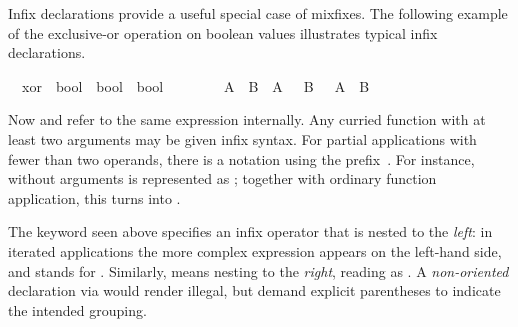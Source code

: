 \begin{isabellebody}
\begin{isamarkuptext}
  Infix declarations provide a useful special
  case of mixfixes.  The following example of the exclusive-or
  operation on boolean values illustrates typical infix declarations.%
\end{isamarkuptext}%
\isamarkuptrue%
\isamarkupfalse%
\isanewline
\ \ xor\ {\isacharcolon}{\isacharcolon}\ {\isachardoublequoteopen}bool\ {\isasymRightarrow}\ bool\ {\isasymRightarrow}\ bool{\isachardoublequoteclose}\ \ \ \ {\isacharparenleft}\ {\isachardoublequoteopen}{\isacharbrackleft}{\isacharplus}{\isacharbrackright}{\isachardoublequoteclose}\ {}{}{\isacharparenright}\isanewline
\ \ {\isachardoublequoteopen}A\ {\isacharbrackleft}{\isacharplus}{\isacharbrackright}\ B\ {\isasymequiv}\ {\isacharparenleft}A\ {\isasymand}\ {\isasymnot}\ B{\isacharparenright}\ {\isasymor}\ {\isacharparenleft}{\isasymnot}\ A\ {\isasymand}\ B{\isacharparenright}{\isachardoublequoteclose}%
\begin{isamarkuptext}%
\noindent Now  and  refer to the
  same expression internally.  Any curried function with at least two
  arguments may be given infix syntax.  For partial applications with
  fewer than two operands, there is a notation using the prefix~.  For instance,  without arguments is represented as
  ; together with ordinary function application, this
  turns  into .

  \medskip The keyword  seen above specifies an
  infix operator that is nested to the \emph{left}: in iterated
  applications the more complex expression appears on the left-hand
  side, and  stands for .  Similarly,  means nesting to the
  \emph{right}, reading  as .  A \emph{non-oriented} declaration via 
  would render  illegal, but demand explicit
  parentheses to indicate the intended grouping.


\end{isamarkuptext}
\end{isabellebody}
